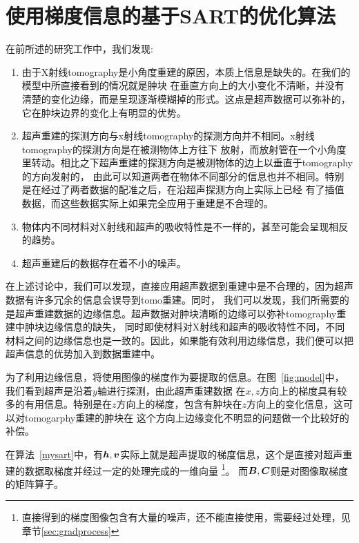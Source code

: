 \section{使用梯度信息的基于SART的优化算法}\label{sec:mysart}
在前所述的研究工作中，我们发现:
\begin{enumerate}
    \item 由于X射线tomography是小角度重建的原因，本质上信息是缺失的。在我们的模型中所直接看到的情况就是肿块
    在垂直方向上的大小变化不清晰，并没有清楚的变化边缘，而是呈现逐渐模糊掉的形式。这点是超声数据可以弥补的，
    它在肿块边界的变化上有明显的优势。
    \item 超声重建的探测方向与x射线tomography的探测方向并不相同。x射线tomography的探测方向是在被测物体上方往下
    放射，而放射管在一个小角度里转动。相比之下超声重建的探测方向是被测物体的边上以垂直于tomography的方向发射的，
    由此可以知道两者在物体不同部分的信息也并不相同。特别是在经过了两者数据的配准之后，在沿超声探测方向上实际上已经
    有了插值数据，而这些数据实际上如果完全应用于重建是不合理的。
    \item 物体内不同材料对X射线和超声的吸收特性是不一样的，甚至可能会呈现相反的趋势。
    \item 超声重建后的数据存在着不小的噪声。
\end{enumerate}
在上述讨论中，我们可以发现，直接应用超声数据到重建中是不合理的，因为超声数据有许多冗余的信息会误导到tomo重建。同时，
我们可以发现，我们所需要的是超声重建数据的边缘信息。超声数据对肿块清晰的边缘可以弥补tomography重建中肿块边缘信息的缺失，
同时即使材料对X射线和超声的吸收特性不同，不同材料之间的边缘信息也是一致的。因此，如果能有效利用边缘信息，我们便可以把
超声信息的优势加入到数据重建中。

为了利用边缘信息，将使用图像的梯度作为要提取的信息。在图~\ref{fig:model}中，我们看到超声是沿着$y$轴进行探测，由此超声重建数据
在$x,z$方向上的梯度具有较多的有用信息。特别是在$z$方向上的梯度，包含有肿块在$z$方向上的变化信息，这可以对tomogarphy重建的肿块在
这个方向上边缘变化不明显的问题做一个比较好的补偿。

在算法~\ref{mysart}中，有$\bm{h},\bm{v}$实际上就是超声提取的梯度信息，这个是直接对超声重建的数据取梯度并经过一定的处理完成的一维向量
\footnote{直接得到的梯度图像包含有大量的噪声，还不能直接使用，需要经过处理，见章节\ref{sec:gradprocess}}。
而$\bm{B},\bm{C} $则是对图像取梯度的矩阵算子。
\clearpage

